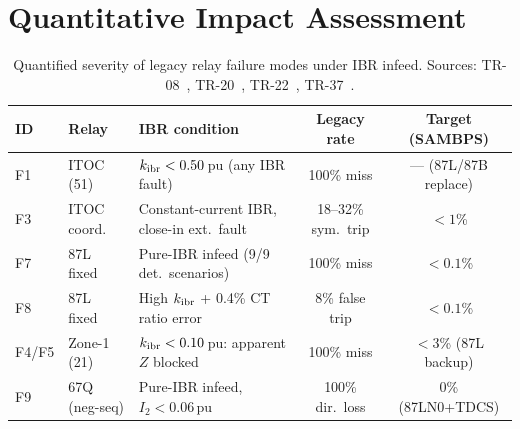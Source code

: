 \section{Quantitative Impact Assessment}
\label{sec:ch3_quantitative}

\begin{table}[htbp]
\centering
\caption{Quantified severity of legacy relay failure modes under IBR infeed.
         Sources: TR-08~\cite{SAMBP_TR08}, TR-20~\cite{SAMBP_TR20},
         TR-22~\cite{SAMBP_TR22}, TR-37~\cite{SAMBP_TR37}.}
\label{tab:ch3_legacy_performance}
\renewcommand{\arraystretch}{1.08}
\small
\begin{tabularx}{\textwidth}{@{}llXcc@{}}
\toprule
ID & Relay & IBR condition & Legacy rate & Target (SAMBPS) \\
\midrule
F1 & ITOC (51) & $k_{\mathrm{ibr}} < 0.50$\,pu (any IBR fault) & 100\% miss & — (87L/87B replace) \\
F3 & ITOC coord. & Constant-current IBR, close-in ext.\ fault & 18--32\% sym.\ trip & $< 1$\% \\
F7 & 87L fixed & Pure-IBR infeed (9/9 det.\ scenarios) & 100\% miss & $< 0.1$\% \\
F8 & 87L fixed & High $k_{\mathrm{ibr}}$ + 0.4\% CT ratio error & 8\% false trip & $< 0.1$\% \\
F4/F5 & Zone-1 (21) & $k_{\mathrm{ibr}} < 0.10$\,pu: apparent $Z$ blocked & 100\% miss & $< 3$\% (87L backup) \\
F9 & 67Q (neg-seq) & Pure-IBR infeed, $I_2 < 0.06$\,pu & 100\% dir.\ loss & 0\% (87LN0+TDCS) \\
\bottomrule
\end{tabularx}
\end{table}

